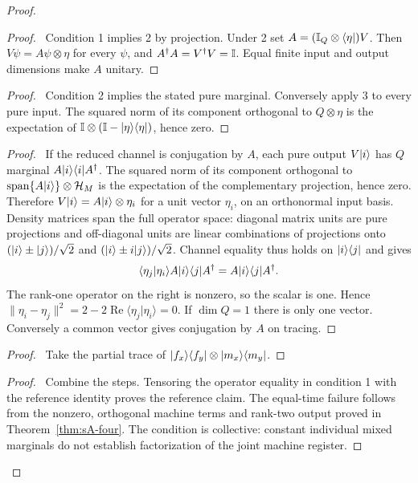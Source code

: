 \begin{proof}
 \begin{proof}\pf\ Condition 1 implies 2 by projection. Under 2 set
 $A=(\mathbb{I}_Q\otimes\langle \eta\rvert)V$. Then $V\psi=A\psi\otimes\eta$
 for every $\psi$, and
 $A^\dagger A=V^\dagger V=\mathbb{I}$. Equal finite input and output
 dimensions make $A$ unitary.\end{proof}
 \begin{proof}\pf\ Condition 2 implies the stated pure marginal.
 Conversely apply 3 to every pure input. The squared norm of its
 component orthogonal to $Q\otimes\eta$ is the expectation of
 $\mathbb{I}\otimes(\mathbb{I}-\lvert \eta\rangle\langle \eta\rvert)$, hence zero.\end{proof}
 \begin{proof}\pf\ If the reduced channel is conjugation by $A$,
 each pure output $V\lvert i\rangle$ has $Q$ marginal
 $A\lvert i\rangle\langle i\rvert A^\dagger$. The squared norm of its component
 orthogonal to $\operatorname{span}\{A\lvert i\rangle\}\otimes\mathcal H_M$
 is the expectation of the complementary projection, hence zero.
 Therefore $V\lvert i\rangle=A\lvert i\rangle\otimes\eta_i$ for a unit vector
 $\eta_i$, on an orthonormal input basis. Density matrices span the
 full operator space: diagonal matrix units are pure projections and
 off-diagonal units are linear combinations of projections onto
 $(\lvert i\rangle\pm\lvert j\rangle)/\sqrt2$ and $(\lvert i\rangle\pm i\lvert j\rangle)/\sqrt2$.
 Channel equality thus holds on $\lvert i\rangle\langle j\rvert$ and gives
 \[
 \langle\eta_j|\eta_i\rangle A\lvert i\rangle\langle j\rvert A^\dagger
       =A\lvert i\rangle\langle j\rvert A^\dagger.
 \]
 The rank-one operator on the right is nonzero, so the scalar is one.
 Hence $\|\eta_i-\eta_j\|^2
 =2-2\operatorname{Re}\langle\eta_j|\eta_i\rangle=0$.
 If $\dim Q=1$ there is only one vector. Conversely a common
 vector gives conjugation by $A$ on tracing.\end{proof}
 \begin{proof}\pf\ Take the partial trace of
 $\lvert f_x\rangle\langle f_y\rvert\otimes\lvert m_x\rangle\langle m_y\rvert$.\end{proof}
 \qedstep
 \begin{proof}\pf\ Combine the steps. Tensoring the operator equality
 in condition 1 with the reference identity proves the reference claim.
 The equal-time failure follows from the nonzero, orthogonal machine
 terms and rank-two output proved in Theorem~\ref{thm:sA-four}.
 The condition is collective: constant individual mixed marginals do
 not establish factorization of the joint machine register.\end{proof}
\end{proof}

